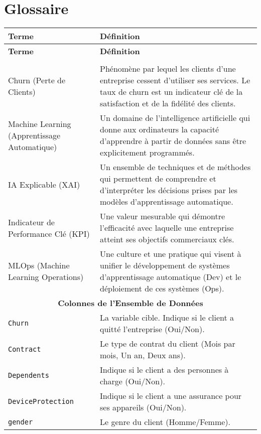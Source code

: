 \chapter{Glossaire}
\label{chap:glossaire}

\begin{longtable}{p{} p{}}
\toprule
\textbf{Terme} & \textbf{Définition} \\
\midrule
\endfirsthead
\toprule
\textbf{Terme} & \textbf{Définition} \\
\midrule
\endhead
\bottomrule
\endfoot

\multicolumn{2}{c}{\textbf{Concepts Généraux}} \\
\midrule
Churn (Perte de Clients) & Phénomène par lequel les clients d'une entreprise cessent d'utiliser ses services. Le taux de churn est un indicateur clé de la satisfaction et de la fidélité des clients. \\
\midrule
Machine Learning (Apprentissage Automatique) & Un domaine de l'intelligence artificielle qui donne aux ordinateurs la capacité d'apprendre à partir de données sans être explicitement programmés. \\
\midrule
IA Explicable (XAI) & Un ensemble de techniques et de méthodes qui permettent de comprendre et d'interpréter les décisions prises par les modèles d'apprentissage automatique. \\
\midrule
Indicateur de Performance Clé (KPI) & Une valeur mesurable qui démontre l'efficacité avec laquelle une entreprise atteint ses objectifs commerciaux clés. \\
\midrule
MLOps (Machine Learning Operations) & Une culture et une pratique qui visent à unifier le développement de systèmes d'apprentissage automatique (Dev) et le déploiement de ces systèmes (Ops). \\
\midrule
\multicolumn{2}{c}{\textbf{Colonnes de l'Ensemble de Données}} \\
\midrule
\texttt{Churn} & La variable cible. Indique si le client a quitté l'entreprise (Oui/Non). \\
\texttt{Contract} & Le type de contrat du client (Mois par mois, Un an, Deux ans). \\
\texttt{Dependents} & Indique si le client a des personnes à charge (Oui/Non). \\
\texttt{DeviceProtection} & Indique si le client a une assurance pour ses appareils (Oui/Non). \\
\texttt{gender} & Le genre du client (Homme/Femme). \\

\end{longtable}
